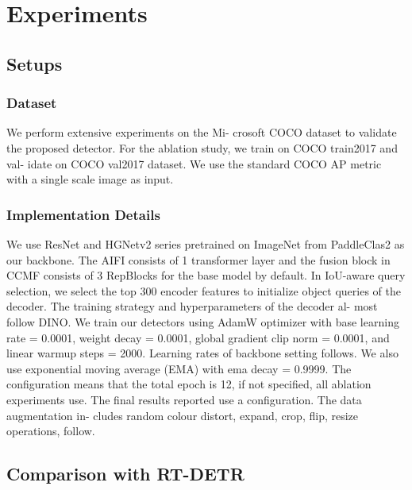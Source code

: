 \chapter{Experiments}

\section{Setups}
\subsection{Dataset}
 We perform extensive experiments on the Mi- crosoft COCO dataset to validate the proposed detector. For the ablation study, we train on COCO train2017 and val- idate on COCO val2017 dataset. We use the standard COCO AP metric with a single scale image as input. 
\subsection{Implementation Details}
We use ResNet and HGNetv2 series pretrained on ImageNet from PaddleClas2 as our backbone. The AIFI consists of 1 transformer layer and the fusion block in CCMF consists of 3 RepBlocks for the base model by default. In IoU-aware query selection, we select the top 300 encoder features to initialize object queries of the decoder. The training strategy and hyperparameters of the decoder al- most follow DINO. We train our detectors using AdamW optimizer with base learning rate = 0.0001, weight decay = 0.0001, global gradient clip norm = 0.0001, and linear warmup steps = 2000. Learning rates of backbone setting follows. We also use exponential moving average (EMA) with ema decay = 0.9999. The configuration means that the total epoch is 12, if not specified, all ablation experiments use. The final results reported use a configuration. The data augmentation in- cludes random {colour distort, expand, crop, flip, resize} operations, follow.

\section{Comparison with RT-DETR}
 